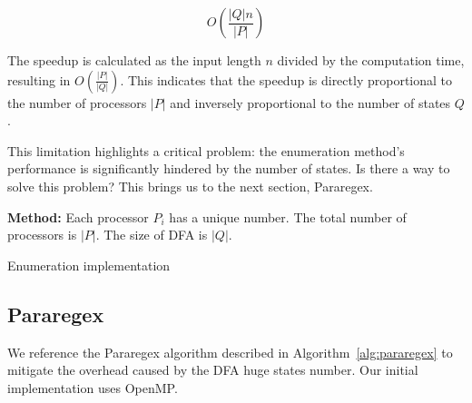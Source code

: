\documentclass[sigconf]{acmart}
\let\oldnl\nl%
\newcommand{\nonl}{\renewcommand{\nl}{\let\nl\oldnl}}%
\begin{document}
\[
	O\left(\frac{|Q|n}{|P|}\right)
\]

The speedup is calculated as the input length $n$ divided by the computation time, resulting in $O\left(\frac{|P|}{|Q|}\right)$. This indicates that the speedup is directly proportional to the number of processors $|P|$ and inversely proportional to the number of states $Q$.

This limitation highlights a critical problem: the enumeration method's performance is significantly hindered by the number of states. Is there a way to solve this problem? This brings us to the next section, Pararegex.

\begin{algorithm}
	\nonl\textbf{Method:}
	Each processor $P_i$ has a unique number. The total number of processors is $|P|$. The size of DFA is $|Q|$.

	\caption{Enumeration implementation}
	\label{alg:enumeration}
\end{algorithm}

\subsection{Pararegex}
We reference the Pararegex \cite{pararegex} algorithm described in Algorithm~\ref{alg:pararegex} to mitigate the overhead caused by the DFA huge states number. Our initial implementation uses OpenMP.
\end{document}
